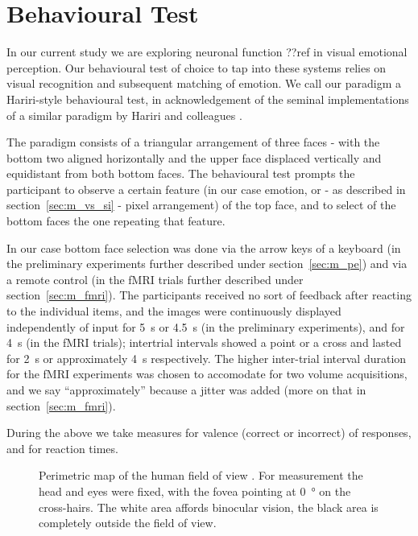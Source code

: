     \section{Behavioural Test}\label{ref:m_bt}
	In our current study we are exploring neuronal function ??ref in visual emotional perception.
	Our behavioural test of choice to tap into these systems relies on visual recognition and subsequent matching of emotion.
	We call our paradigm a Hariri-style behavioural test, in acknowledgement of the seminal implementations of a similar paradigm by Hariri and colleagues \cite{Hariri2000,Hariri2003}.
	    
	The paradigm consists of a triangular arrangement of three faces - with the bottom two aligned horizontally and the upper face displaced vertically and equidistant from both bottom faces.
	The behavioural test prompts the participant to observe a certain feature (in our case emotion, or - as described in section~\ref{sec:m_vs_si} - pixel arrangement) of the top face, and to select of the bottom faces the one repeating that feature.
	
	In our case bottom face selection was done via the arrow keys of a keyboard (in the preliminary experiments further described under section~\ref{sec:m_pe}) and via a remote control (in the fMRI trials further described under section~\ref{sec:m_fmri}).
	The participants received no sort of feedback after reacting to the individual items, and the images were continuously displayed independently of input for \SI{5}{\second} or \SI{4.5}{\second} (in the preliminary experiments), and for \SI{4}{\second} (in the fMRI trials); intertrial intervals showed a point or a cross and lasted for \SI{2}{\second} or approximately \SI{4}{\second} respectively.
	The higher inter-trial interval duration for the fMRI experiments was chosen to accomodate for two volume acquisitions, and we say “approximately” because a jitter was added (more on that in section~\ref{sec:m_fmri}). 
	
	During the above we take measures for valence (correct or incorrect) of responses, and for reaction times.
	
	\begin{wrapfigure}{r}{0.45\textwidth}
	  \centering
	    \caption{Perimetric map of the human field of view \cite{Ruch1960}.
	    For measurement the head and eyes were fixed, with the fovea pointing at \SI{0}{\degree} on the cross-hairs.
	    The white area affords binocular vision, the black area is completely outside the field of view.}
	    \label{fig:m_b_1}
	    \vspace{-1.0cm}
	\end{wrapfigure}
	
